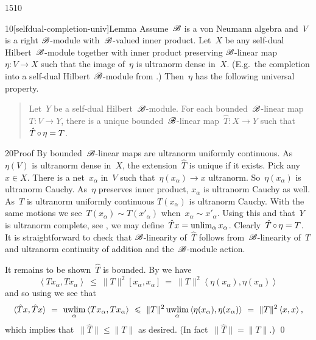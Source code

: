 \begin{parsec}{1510}%
\begin{point}{10}[selfdual-completion-univ]{Lemma}%
Assume~$\mathscr{B}$ is a von Neumann algebra
    and~$V$ is a right $\mathscr{B}$-module
    with~$\mathscr{B}$-valued inner product.
Let~$X$ be any self-dual Hilbert~$\mathscr{B}$-module
    together with inner product preserving
    $\mathscr{B}$-linear map~$\eta\colon V \to X$
    such that the image of~$\eta$ is ultranorm dense in~$X$.
(E.g.~the completion into a self-dual Hilbert~$\mathscr{B}$-module
from .)
Then~$\eta$ has the following universal property.
\begin{quote}
Let~$Y$ be a self-dual Hilbert~$\mathscr{B}$-module.
For each bounded~$\mathscr{B}$-linear
    map~$T\colon V \to Y$,
    there is a unique bounded~$\mathscr{B}$-linear
    map~$\hat{T} \colon X \to Y$
    such that~$\hat{T} \mathop{\circ} \eta = T$.
\end{quote}
\begin{point}{20}{Proof}%
By  bounded~$\mathscr{B}$-linear
    maps are ultranorm uniformly continuous.
As~$\eta(V)$ is ultranorm dense in~$X$,
    the extension~$\hat{T}$ is unique if it exists.
Pick any~$x \in X$.
There is a net~$x_\alpha$ in~$V$ such
    that~$\eta(x_\alpha) \to x$ ultranorm.
So~$\eta(x_\alpha)$ is ultranorm Cauchy.
As~$\eta$ preserves inner product,
    $x_\alpha$ is ultranorm Cauchy as well.
As~$T$ is ultranorm uniformly continuous
    $T(x_\alpha)$ is ultranorm Cauchy.
With the same motions we see~$T(x_\alpha) \sim T(x'_\alpha)$
    when~$x_\alpha \sim x'_\alpha$.
Using this and that~$Y$ is ultranorm complete, see ,
    we may define~$\hat{T} x = \unlim_\alpha x_\alpha$.
Clearly~$\hat{T}\mathop{\circ}\eta=T$.
It is straightforward to check
    that $\mathscr{B}$-linearity
    of~$\hat{T}$
    follows from~$\mathscr{B}$-linearity of~$T$
    and ultranorm continuity of addition and
        the~$\mathscr{B}$-module action.

It remains to be shown~$\hat{T}$ is bounded.
By   we have
\begin{equation*}
\left<T x_\alpha,T x_\alpha\right>
\ \leq\  \| T\|^2 [x_\alpha,x_\alpha]
\ =\  \|T\|^2 \left<\eta(x_\alpha),\eta(x_\alpha)\right>
\end{equation*}
and so using  we see that
\begin{equation*}
\langle\hat{T} x, \hat{T} x\rangle \ =\ 
\uwlim_\alpha \left<T x_\alpha, T x_\alpha\right>
            \ \leq \ \|T\|^2 \uwlim_\alpha \left<\eta(x_\alpha), \eta(x_\alpha)\right>
            \ =\  \|T\|^2 \left<x,x\right>,
\end{equation*}
which implies that~$\|\hat{T}\| \leq \|T\|$ as desired.
(In fact~$\|\hat{T}\| = \|T\|$.) \qed
\end{point}
\end{point}
\end{parsec}
